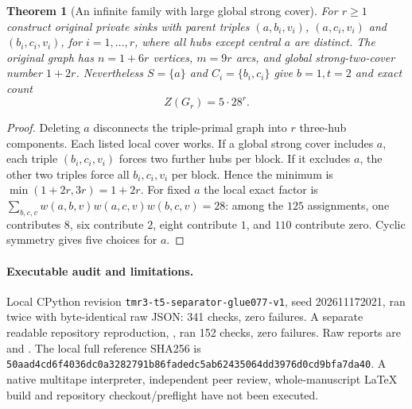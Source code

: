 \documentclass[11pt]{article}
\newtheorem{theorem}{Theorem}
\begin{document}
\begin{theorem}[An infinite family with large global strong cover]
For $r\ge1$ construct original private sinks with parent triples
$(a,b_i,v_i)$, $(a,c_i,v_i)$ and $(b_i,c_i,v_i)$,
for $i=1,\ldots,r$, where all hubs except central $a$
are distinct. The original graph has $n=1+6r$ vertices,
$m=9r$ arcs, and global strong-two-cover number $1+2r$.
Nevertheless $S=\{a\}$ and $C_i=\{b_i,c_i\}$
give $b=1,t=2$ and exact count
\[
\boxed{Z(G_r)=5\cdot28^r.}
\]
\end{theorem}
\begin{proof}
Deleting $a$ disconnects the triple-primal graph into $r$
three-hub components. Each listed local cover works.
If a global strong cover includes $a$, each triple
$(b_i,c_i,v_i)$ forces two further hubs per block.
If it excludes $a$, the other two triples force all
$b_i,c_i,v_i$ per block. Hence the minimum is
$\min(1+2r,3r)=1+2r$.
For fixed $a$ the local exact factor is
$\sum_{b,c,v}w(a,b,v)w(a,c,v)w(b,c,v)=28$:
among the $125$ assignments, one contributes $8$,
six contribute $2$, eight contribute $1$, and $110$
contribute zero. Cyclic symmetry gives five choices for $a$.
\end{proof}

\paragraph{Executable audit and limitations.}
Local CPython revision \texttt{tmr3-t5-separator-glue077-v1},
seed 202611172021, ran twice with byte-identical raw JSON:
341 checks, zero failures. A separate readable repository
reproduction, ,
ran 152 checks, zero failures. Raw reports are
and .
The local full reference SHA256 is
\texttt{50aad4cd6f4036dc0a3282791b86fadedc5ab62435064dd3976d0cd9bfa7da40}.
A native multitape interpreter, independent peer review,
whole-manuscript LaTeX build and repository checkout/preflight
have not been executed.
\end{document}
